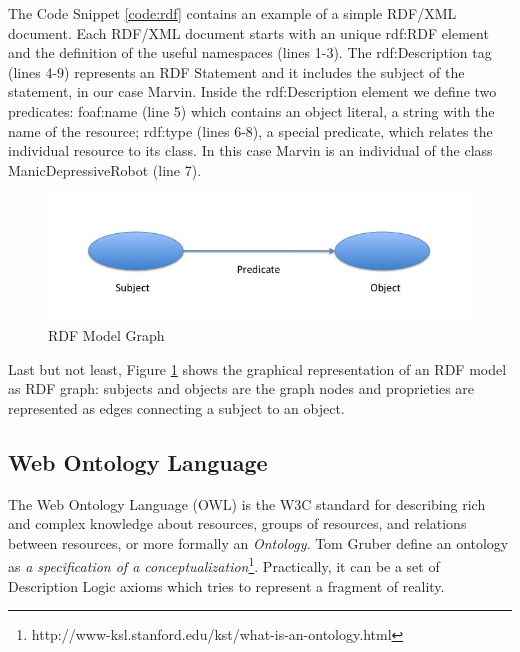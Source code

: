 The Code Snippet \ref{code:rdf} contains an example of a simple RDF/XML document. Each RDF/XML document starts with an unique rdf:RDF element and the definition of the useful namespaces (lines 1-3). The rdf:Description tag (lines 4-9) represents an RDF Statement and it includes the subject of the statement, in our case Marvin. Inside the rdf:Description element we define two predicates: foaf:name (line 5) which contains an object literal, a string with the name of the resource; rdf:type (lines 6-8), a special predicate, which relates the individual resource to its class. In this case Marvin is an individual of the class ManicDepressiveRobot (line 7).

\begin{figure}[tbh]
  \centering
	\includegraphics[width=0.75\linewidth]{images/rdf-graph}
	\caption{RDF Model Graph} 
  	\label{fig:rdf-graph}
\end{figure}

Last but not least, Figure \ref{fig:rdf-graph} shows the graphical representation of an RDF model as RDF graph:  subjects and objects are the graph nodes and proprieties are represented as edges connecting a subject to an object. 




\subsection{Web Ontology Language}\label{sec:owl}

The Web Ontology Language (OWL) is the W3C standard for describing rich and complex knowledge about resources, groups of resources, and relations between resources, or more formally an \textit{Ontology}. Tom Gruber define an ontology as \textit{a specification of a conceptualization}\footnote{http://www-ksl.stanford.edu/kst/what-is-an-ontology.html}. Practically, it can be a set of Description Logic axioms which tries to represent a fragment of reality. 

